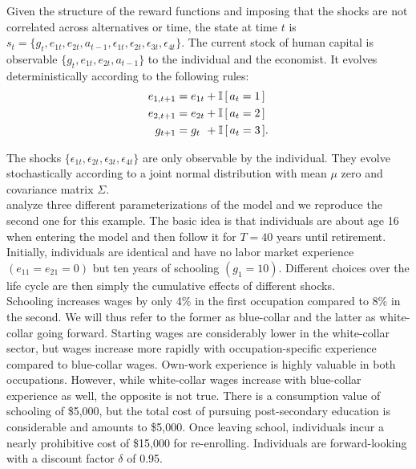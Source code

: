 \noindent Given the structure of the reward functions and imposing that the shocks are not correlated across alternatives or time, the state at time $t$ is $s_t = \{g_t,e_{1t},e_{2t},a_{t - 1},\epsilon_{1t},\epsilon_{2t},\epsilon_{3t},\epsilon_{4t}\}$.
%
The current stock of human capital is observable $\{g_t,e_{1t},e_{2t},a_{t - 1}\}$ to the individual and the economist. It evolves deterministically according to the following rules:
%
\begin{align*}
    e_{1,t+1} &= e_{1t} + \mathbb{I}\,[\,a_t = 1\,] \\
    e_{2,t+1} &= e_{2t} + \mathbb{I}\,[\,a_t = 2\,] \\
    g_{t+1}   &= g_{t\phantom{2}}    +  \mathbb{I}\,[\,a_t = 3\,].
\end{align*}

\noindent The shocks $\{\epsilon_{1t},\epsilon_{2t},\epsilon_{3t},\epsilon_{4t}\}$ are only observable by the individual. They evolve stochastically according to a joint normal distribution with mean $\mu$ zero and covariance matrix $\Sigma$.\\

\noindent \citet{Keane.1994} analyze three different parameterizations of the model and we reproduce the second one for this example. The basic idea is that individuals are about age 16 when entering the model and then follow it for $T = 40$ years until retirement. Initially, individuals are identical and have no labor market experience $(e_{11} = e_{21} = 0)$ but ten years of schooling $(g_1 = 10)$. Different choices over the life cycle are then simply the cumulative effects of different shocks.\\

\noindent Schooling increases wages by only 4\% in the first occupation compared to 8\% in the second. We will thus refer to the former as blue-collar and the latter as white-collar going forward. Starting wages are considerably lower in the white-collar sector, but wages increase more rapidly with occupation-specific experience compared to blue-collar wages. Own-work experience is highly valuable in both occupations. However, while white-collar wages increase with blue-collar experience as well, the opposite is not true. There is a consumption value of schooling of \$5,000, but the total cost of pursuing post-secondary education is considerable and amounts to \$5,000. Once leaving school, individuals incur a nearly prohibitive cost of \$15,000 for re-enrolling. Individuals are forward-looking with a discount factor $\delta$ of 0.95.\\

